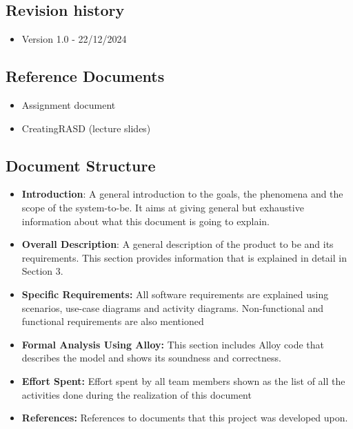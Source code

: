 \subsection{Revision history}
 \begin{itemize}
     \item Version 1.0 - 22/12/2024
 \end{itemize}
\subsection{Reference Documents}

\begin{itemize}
    \item Assignment document
    \item CreatingRASD (lecture slides)
\end{itemize}

\subsection{Document Structure}

\begin{itemize}
    \item \textbf{Introduction}: A general introduction to the goals, the phenomena and the scope of
            the system-to-be. It aims at giving general but exhaustive information about what this
            document is going to explain.
    \item \textbf{Overall Description}: A general description of the product to be and its requirements.
            This section provides information that is explained in detail in Section 3.
    \item \textbf{Specific Requirements:} All software requirements are explained using scenarios,
            use-case diagrams and activity diagrams. Non-functional and functional requirements
            are also mentioned
    \item \textbf{Formal Analysis Using Alloy:} This section includes Alloy code that describes the
            model and shows its soundness and correctness.
    \item \textbf{Effort Spent:} Effort spent by all team members shown as the list of all the activities
            done during the realization of this document
    \item \textbf{References:} References to documents that this project was developed upon.
\end{itemize}